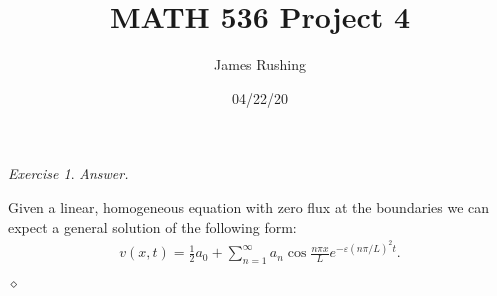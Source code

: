 \documentclass[12pt,oneside]{amsart}
\title{MATH 536 Project 4}
\author{James Rushing}
\date{04/22/20}
\theoremstyle{definition}
\theoremstyle{remark}
\newtheorem{exer}{Exercise}
\numberwithin{equation}{exer}
\newenvironment{answer}{\bigskip\noindent\emph{Answer.}}{\hfill$\diamond$\newline}
\begin{document}
\maketitle
\begin{exer} 
\newline
\begin{answer}

\indent\newline
Given a linear, homogeneous equation with zero flux at the boundaries we can expect a general solution of the following form:
\begin{align}
    v(x,t) = \frac{1}{2} a_0 + \sum_{n=1}^\infty a_n \cos{\frac{n \pi x}{L}}e^{-\varepsilon(n \pi/L)^2t}.
\end{align}

\end{answer}
\end{exer}
\end{document}
